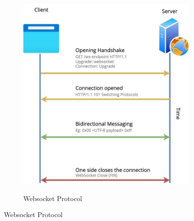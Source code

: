 \begin{figure}[h!]
    \centering
    \begin{subfigure}[b]{0.3\textwidth}
         \centering
    \includegraphics[height=300pt]{txt/pictures/understanding-websockets-with-aspnetcore-1.jpg}
    \caption{Websocket Protocol \cite{websocket_image}}
    \label{fig:websocket}
    \end{subfigure}
\end{figure}